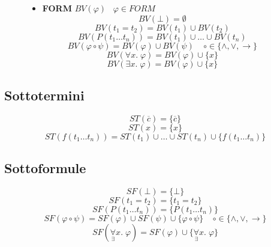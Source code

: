 \documentclass{article}
\theoremstyle{break}
\theoremstyle{break}
\theoremstyle{break}
\theoremstyle{break}
\begin{document}
\begin{figure}[H]
  \begin{definition}
    \begin{itemize}
      \item \textbf{FORM} \( BV(\varphi)\;\;\;\varphi \in FORM \) 
        \[
          BV(\bot) = \emptyset
        \] 
        \[
          BV(t_1 = t_2) = BV(t_1) \cup BV(t_2) 
        \] 
        \[
          BV(P(t_1 \ldots t_n)) = BV(t_1) \cup  \ldots  \cup  BV(t_n)
        \] 
        \[
          BV(\varphi \circ \psi) = BV(\varphi) \cup BV(\psi) \;\;\;\; \circ \in \{\wedge, \vee, \to \} 
        \] 
        \[
          BV(\forall x.\; \varphi) = BV(\varphi) \cup \{x\} 
        \] 
        \[
          BV(\exists x.\; \varphi) = BV(\varphi) \cup \{x\} 
        \] 
    \end{itemize} 
  \end{definition}
\end{figure}


\subsection{Sottotermini}
\[
  ST(\overline{c}) = \{\overline{c}\} 
\] 
\[
  ST(x) = \{x\} 
\] 
\[
  ST(f(t_1 \ldots t_n)) = ST(t_1) \cup \ldots \cup ST(t_n) \cup \{f(t_1 \ldots t_n)\} 
\] 
\subsection{Sottoformule}
\[
  SF(\bot) = \{\bot\} 
\] 
\[
  SF(t_1 = t_2) = \{t_1 = t_2\} 
\] 
\[
  SF(P(t_1 \ldots t_n)) = \{P(t_1 \ldots t_n)\} 
\] 
\[
  SF(\varphi \circ \psi) = SF(\varphi) \cup SF(\psi) \cup \{\varphi \circ \psi\}\;\;\;\; \circ \in \{\wedge, \vee, \to \}  
\] 
\[
  SF(\underset{\exists}{\forall}x.\; \varphi) = SF(\varphi) \cup \{\underset{\exists}{\forall}x.\; \varphi\}
\] 
\end{document}
